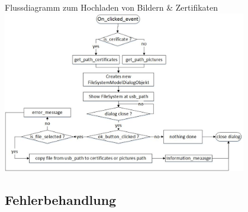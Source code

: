 \documentclass{beamer}
\begin{document}
	\begin{frame}
		\centering
			\Large Flussdiagramm zum Hochladen von Bildern \& Zertifikaten\\
		    \vspace{1em}
			\includegraphics[width=0.8\textwidth]{flussdiagramm.png}\\
	\end{frame}


\subsection{Fehlerbehandlung}

\end{document}
